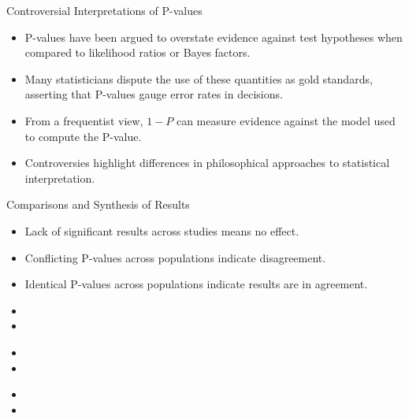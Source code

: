 \documentclass[aspectratio=169, 12pt]{beamer}
\begin{document}
\begin{frame}{Controversial Interpretations of P-values}
\begin{itemize}
    \item P-values have been argued to overstate evidence against test hypotheses when compared to likelihood ratios or Bayes factors.
    \item Many statisticians dispute the use of these quantities as gold standards, asserting that P-values gauge error rates in decisions.
    \item From a frequentist view, \( 1 - P \) can measure evidence against the model used to compute the P-value.
    \item Controversies highlight differences in philosophical approaches to statistical interpretation.
\end{itemize}
\end{frame}

\begin{frame}{Comparisons and Synthesis of Results} %
\begin{itemize}
    \item Lack of significant results across studies means no effect.
    \item Conflicting P-values across populations indicate disagreement.
    \item Identical P-values across populations indicate results are in agreement.
\end{itemize}
\end{frame}

\begin{frame}{}
\begin{itemize}
    \item
    \item
\end{itemize}
\end{frame}

\begin{frame}{}
\begin{itemize}
    \item
    \item
\end{itemize}
\end{frame}

\begin{frame}{}
\begin{itemize}
    \item
    \item
\end{itemize}
\end{frame}
\end{document}
